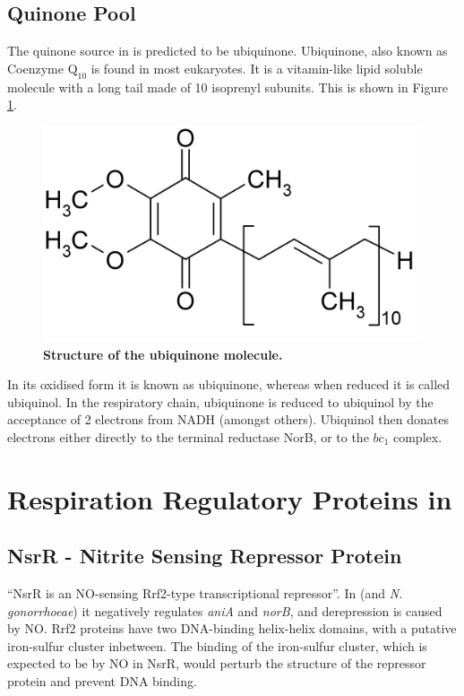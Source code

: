 \subsection{Quinone Pool}
The quinone source in \Nm{} is predicted to be ubiquinone\cite{Deeudom2007}. Ubiquinone, also known as Coenzyme $\mathrm{Q}_{10}$ is found in most eukaryotes. It is a vitamin-like lipid soluble molecule with a long tail made of 10 isoprenyl subunits. This is shown in Figure \ref{fig:Ubiquinone}.

\begin{figure}[tbp]
	\begin{center}
		\includegraphics[width=14cm]{01-introduction/data/Ubiquinone.png}
	\caption[{\bf Structure of the ubiquinone molecule.}]{{\bf Structure of the ubiquinone molecule.}
	\label{fig:Ubiquinone}}
	\end{center}
\end{figure}

In its oxidised form it is known as ubiquinone, whereas when reduced it is called ubiquinol. In the \Nm{} respiratory chain, ubiquinone is reduced to ubiquinol by the acceptance of 2 electrons from NADH (amongst others). Ubiquinol then donates electrons either directly to the terminal reductase NorB, or to the $bc_1$ complex.

\section{Respiration Regulatory Proteins in \Nm{}}
\subsection{NsrR - Nitrite Sensing Repressor Protein}
``NsrR is an NO-sensing Rrf2-type transcriptional repressor''\cite{Barth2009}. In \Nm{} (and \textit{N. gonorrhoeae}) it negatively regulates \textit{aniA} and \textit{norB}, and derepression is caused by NO\cite{Rock2007,Heurlier2008,Isabella2008}. Rrf2 proteins have two DNA-binding helix-helix domains\cite{Rock2007}, with a putative iron-sulfur cluster inbetween. The binding of the iron-sulfur cluster, which is expected to be by NO in NsrR, would perturb the structure of the repressor protein and prevent DNA binding\cite{Rock2007}.

